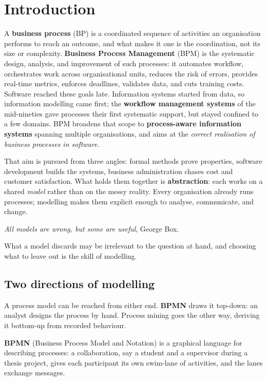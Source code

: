 \section{Introduction}

A \textbf{business process} (BP) is a coordinated sequence of activities an organisation performs to reach an outcome, and what makes it one is the coordination, not its size or complexity. \textbf{Business Process Management} (BPM) is the systematic design, analysis, and improvement of such processes: it automates workflow, orchestrates work across organisational units, reduces the risk of errors, provides real-time metrics, enforces deadlines, validates data, and cuts training costs. Software reached these goals late. Information systems started from data, so information modelling came first; the \textbf{workflow management systems} of the mid-nineties gave processes their first systematic support, but stayed confined to a few domains. BPM broadens that scope to \textbf{process-aware information systems} spanning multiple organisations, and aims at the \emph{correct realisation of business processes in software}.

That aim is pursued from three angles: formal methods prove properties, software development builds the systems, business administration chases cost and customer satisfaction. What holds them together is \textbf{abstraction}: each works on a shared \emph{model} rather than on the messy reality. Every organisation already runs processes; modelling makes them explicit enough to analyse, communicate, and change.

\begin{notebox}
  \emph{All models are wrong, but some are useful}, George Box.

  What a model discards may be irrelevant to the question at hand, and choosing what to leave out is the skill of modelling.
\end{notebox}

\subsection{Two directions of modelling}

A process model can be reached from either end. \textbf{BPMN} draws it top-down: an analyst designs the process by hand. Process mining goes the other way, deriving it bottom-up from recorded behaviour.

\textbf{BPMN} (Business Process Model and Notation) is a graphical language for describing processes: a collaboration, say a student and a supervisor during a thesis project, gives each participant its own swim-lane of activities, and the lanes exchange messages.

